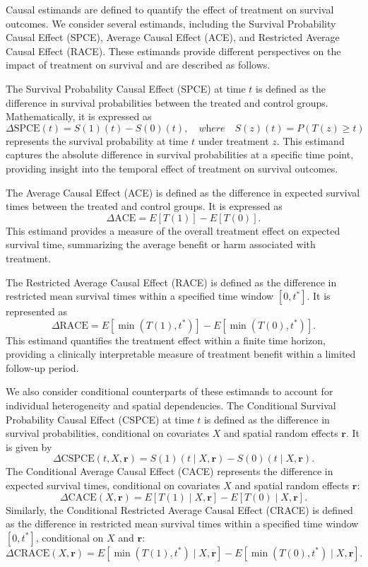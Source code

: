 \documentclass[useAMS,referee]{biom}
\begin{document}
Causal estimands are defined to quantify the effect of treatment on survival outcomes. We consider several estimands, including the Survival Probability Causal Effect (SPCE), Average Causal Effect (ACE), and Restricted Average Causal Effect (RACE). These estimands provide different perspectives on the impact of treatment on survival and are described as follows.

The Survival Probability Causal Effect (SPCE) at time \( t \) is defined as the difference in survival probabilities between the treated and control groups. Mathematically, it is expressed as 
\[
\Delta \text{SPCE}(t) = S(1)(t) - S(0)(t), \quad \textit{where} \quad S(z)(t) = P(T(z) \geq t)
\]
represents the survival probability at time \( t \) under treatment \( z \). This estimand captures the absolute difference in survival probabilities at a specific time point, providing insight into the temporal effect of treatment on survival outcomes.

The Average Causal Effect (ACE) is defined as the difference in expected survival times between the treated and control groups. It is expressed as 
\[
\Delta \text{ACE} = E[T(1)] - E[T(0)].
\]
This estimand provides a measure of the overall treatment effect on expected survival time, summarizing the average benefit or harm associated with treatment.

The Restricted Average Causal Effect (RACE) is defined as the difference in restricted mean survival times within a specified time window \( [0, t^*] \). It is represented as 
\[
\Delta \text{RACE} = E[\min(T(1), t^*)] - E[\min(T(0), t^*)].
\]
This estimand quantifies the treatment effect within a finite time horizon, providing a clinically interpretable measure of treatment benefit within a limited follow-up period.

We also consider conditional counterparts of these estimands to account for individual heterogeneity and spatial dependencies. The Conditional Survival Probability Causal Effect (CSPCE) at time \( t \) is defined as the difference in survival probabilities, conditional on covariates \( X \) and spatial random effects \(\bm{r}\). It is given by 
\[
\Delta \text{CSPCE}(t, X, \bm{r}) = S(1)(t \mid X, \bm{r}) - S(0)(t \mid X, \bm{r}).
\]
The Conditional Average Causal Effect (CACE) represents the difference in expected survival times, conditional on covariates \( X \) and spatial random effects \(\bm{r}\):
\[
\Delta \text{CACE}(X, \bm{r}) = E[T(1) \mid X, \bm{r}] - E[T(0) \mid X, \bm{r}].
\]
Similarly, the Conditional Restricted Average Causal Effect (CRACE) is defined as the difference in restricted mean survival times within a specified time window \( [0, t^*] \), conditional on \( X \) and \(\bm{r}\):
\[
\Delta \text{CRACE}(X, \bm{r}) = E[\min(T(1), t^*) \mid X, \bm{r}] - E[\min(T(0), t^*) \mid X, \bm{r}].
\]
\end{document}
